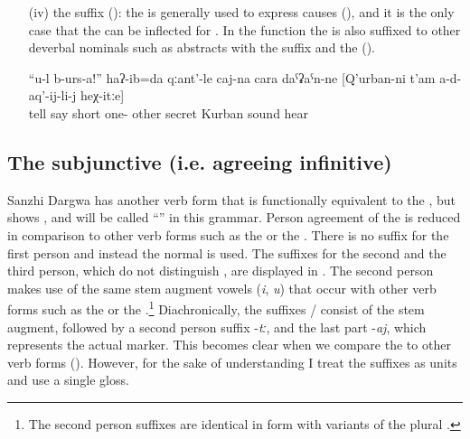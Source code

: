 \begin{enumerate}
	\item[(iv)]	the suffix  (): the  is generally used to express causes (), and it is the only case that the  can be inflected for . In the  function the  is also suffixed to other deverbal nominals such as abstracts  with the suffix  and the  ().
	\begin{exe}
		\ex	\label{ex:‎‎You tell him, I said silently like this, such that Kurban cannot hear it}
		\gll	``u-l	b-urs-a!''		haʔ-ib=da	qːant'-le	caj-na	cara	daˁʡaˁn-ne		[Q'urban-ni	t'am	a-d-aq'-ij-li-j		heχ-itːe]\\
				tell	say		short	one-	other	secret		Kurban	sound	hear		\\
		\glt	{}
	\end{exe}


\end{enumerate}



\subsection{The subjunctive (i.e. agreeing infinitive)}
\label{ssec:The subjunctive (agreeing infinitive)}

Sanzhi Dargwa has another verb form that is functionally equivalent to the , but shows , and will be called ``'' in this grammar. Person agreement of the  is reduced in comparison to other verb forms such as the  or the . There is no suffix for the first person and instead the normal  is used. The suffixes for the second and the third person, which do not distinguish , are displayed in . The second person makes use of the same stem augment vowels (\textit{i}, \textit{u}) that occur with other verb forms such as the  or the .\footnote{The second person  suffixes are identical in form with variants of the plural .} Diachronically, the suffixes \slash{} consist of the stem augment, followed by a second person suffix -\textit{tː}, and the last part -\textit{aj}, which represents the actual  marker. This becomes clear when we compare the  to other verb forms (). However, for the sake of understanding I treat the suffixes as units and use a single gloss.

